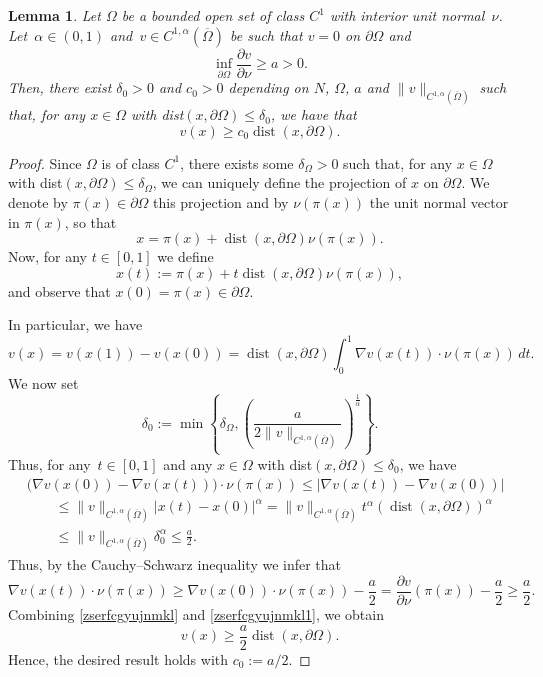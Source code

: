 \documentclass[12pt,a4paper,intlimits,sumlimits]{amsart}
\theoremstyle{definition}
\theoremstyle{plain}
\newtheorem{lemma}[definition]{Lemma}
\numberwithin{equation}{section}
\renewcommand{\leq}{\leqslant}
\renewcommand{\le}{\leqslant}
\renewcommand{\geq}{\geqslant}
\begin{document}
\begin{appendix}
\begin{lemma}\label{lemmavicinobordo}
Let $\Omega$ be a bounded open set of class $C^1$ with interior unit normal~$\nu$. Let~$\alpha\in (0, 1)$
and~$v\in C^{1,\alpha}(\overline \Omega)$ be such that $v=0$ on $\partial \Omega$ and 
\[
\inf_{\partial \Omega}\frac{\partial v}{\partial \nu}\geq a>0.
\]
Then, there exist $\delta_0>0$ and $c_0>0$ depending on $N$,
$\Omega$, $a$ and $\|v\|_{C^{1,\alpha}(\overline \Omega)}$ such that, for any 
$x\in \Omega$ with dist$(x,\partial \Omega)\leq \delta_0$, we have that
\[
v(x)\geq c_0 \operatorname{dist}(x,\partial \Omega).
\]
\end{lemma}
\begin{proof}
Since $\Omega$ is of class $C^1$, there exists some $\delta_\Omega>0$ such that, for any $x\in \Omega$ with dist$(x,\partial \Omega)\leq \delta_\Omega$, we can uniquely
define the projection of $x$ on $\partial \Omega$. We denote by $\pi(x)\in \partial \Omega$ this projection and by $\nu(\pi(x))$ the unit normal vector in $\pi(x)$, so that
\[
x=\pi(x)+\operatorname{dist}(x,\partial \Omega)\nu(\pi(x)).
\]
Now, for any $t\in[0,1]$ we define
\[
x(t):=\pi(x)+t\operatorname{dist}(x,\partial \Omega)\nu(\pi(x)),
\]
and observe that $x(0)=\pi(x)\in \partial \Omega$.

In particular, we have
\begin{equation}\label{zserfcgyujnmkl}
v(x)=v(x(1))-v(x(0))=\operatorname{dist}(x,\partial \Omega)\int_0^1 \nabla v(x(t))\cdot \nu(\pi(x))\,dt.
\end{equation}
We now set 
\[
\delta_0:=\min\left\{\delta_\Omega, \left(\frac{a}{2\|v\|_{C^{1,\alpha}(\overline\Omega)}}\right)^\frac{1}{\alpha}\right\}.
\]
Thus, for any~$t\in[0,1]$ and any $x\in \Omega$ with dist$(x,\partial \Omega)\leq \delta_0$, we have
\[
\begin{aligned}
&\big(\nabla v(x(0))-\nabla v(x(t))\big)\cdot\nu(\pi(x))\le
|\nabla v(x(t))-\nabla v(x(0))|\\&\qquad\leq \|v\|_{C^{1,\alpha}(\overline\Omega)}|x(t)-x(0)|^\alpha 
=\|v\|_{C^{1,\alpha}(\overline\Omega)}t^\alpha(\operatorname{dist}(x,\partial \Omega))^\alpha \\
&\qquad\leq \|v\|_{C^{1,\alpha}(\overline\Omega)} \delta_0^\alpha \leq \frac{a}{2}.
\end{aligned}
\]
Thus, by the Cauchy–Schwarz inequality we infer that
\begin{equation}\label{zserfcgyujnmkl1}
\nabla v(x(t))\cdot\nu(\pi(x))\geq \nabla v(x(0))\cdot\nu(\pi(x))-\frac{a}{2}=\frac{\partial v}{\partial \nu}(\pi(x))-\frac{a}{2}\geq \frac{a}{2}.
\end{equation}
Combining \eqref{zserfcgyujnmkl} and \eqref{zserfcgyujnmkl1}, we obtain
\[
v(x)\geq \frac{a}{2}\operatorname{dist}(x,\partial \Omega).
\]
Hence, the desired result holds with $c_0:=a/2$.
\end{proof}


\end{appendix}
\end{document}
